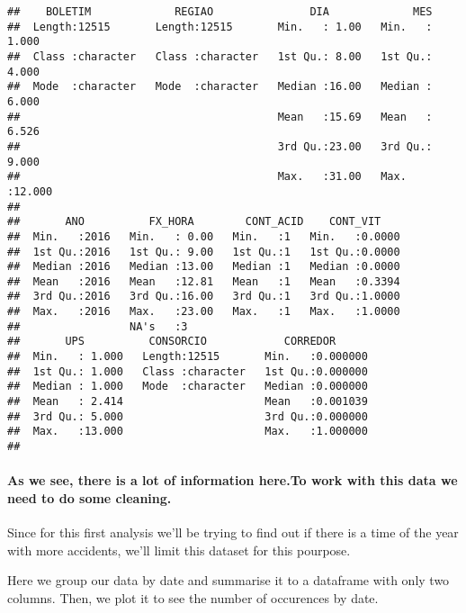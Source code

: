 \documentclass[]{article}
\newenvironment{Shaded}{\begin{snugshade}}{\end{snugshade}}
\newcommand{\KeywordTok}[1]{\textcolor[rgb]{0.13,0.29,0.53}{\textbf{#1}}}
\newcommand{\DataTypeTok}[1]{\textcolor[rgb]{0.13,0.29,0.53}{#1}}
\newcommand{\StringTok}[1]{\textcolor[rgb]{0.31,0.60,0.02}{#1}}
\newcommand{\OperatorTok}[1]{\textcolor[rgb]{0.81,0.36,0.00}{\textbf{#1}}}
\newcommand{\NormalTok}[1]{#1}
\let\oldparagraph\paragraph
\renewcommand{\paragraph}[1]{\oldparagraph{#1}\mbox{}}
\begin{document}
\begin{verbatim}
##    BOLETIM             REGIAO               DIA             MES        
##  Length:12515       Length:12515       Min.   : 1.00   Min.   : 1.000  
##  Class :character   Class :character   1st Qu.: 8.00   1st Qu.: 4.000  
##  Mode  :character   Mode  :character   Median :16.00   Median : 6.000  
##                                        Mean   :15.69   Mean   : 6.526  
##                                        3rd Qu.:23.00   3rd Qu.: 9.000  
##                                        Max.   :31.00   Max.   :12.000  
##                                                                        
##       ANO          FX_HORA        CONT_ACID    CONT_VIT     
##  Min.   :2016   Min.   : 0.00   Min.   :1   Min.   :0.0000  
##  1st Qu.:2016   1st Qu.: 9.00   1st Qu.:1   1st Qu.:0.0000  
##  Median :2016   Median :13.00   Median :1   Median :0.0000  
##  Mean   :2016   Mean   :12.81   Mean   :1   Mean   :0.3394  
##  3rd Qu.:2016   3rd Qu.:16.00   3rd Qu.:1   3rd Qu.:1.0000  
##  Max.   :2016   Max.   :23.00   Max.   :1   Max.   :1.0000  
##                 NA's   :3                                   
##       UPS          CONSORCIO            CORREDOR       
##  Min.   : 1.000   Length:12515       Min.   :0.000000  
##  1st Qu.: 1.000   Class :character   1st Qu.:0.000000  
##  Median : 1.000   Mode  :character   Median :0.000000  
##  Mean   : 2.414                      Mean   :0.001039  
##  3rd Qu.: 5.000                      3rd Qu.:0.000000  
##  Max.   :13.000                      Max.   :1.000000  
## 
\end{verbatim}

\paragraph{As we see, there is a lot of information here.To work with
this data we need to do some
cleaning.}\label{as-we-see-there-is-a-lot-of-information-here.to-work-with-this-data-we-need-to-do-some-cleaning.}

Since for this first analysis we'll be trying to find out if there is a
time of the year with more accidents, we'll limit this dataset for this
pourpose.

Here we group our data by date and summarise it to a dataframe with only
two columns. Then, we plot it to see the number of occurences by date.

\begin{Shaded}
\end{Shaded}
\end{document}
